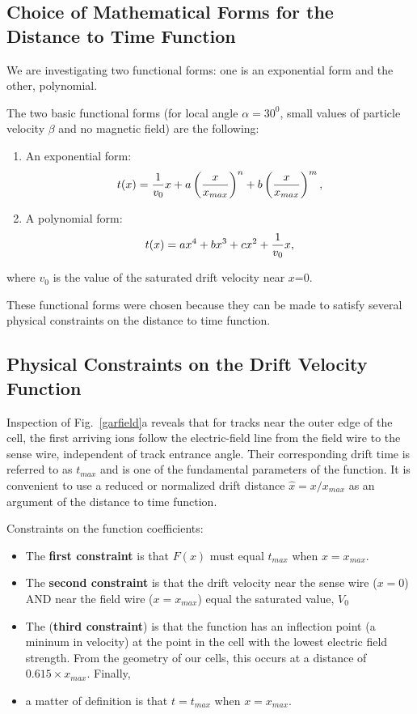 \documentclass{article}
\begin{document}
\subsection{Choice of Mathematical Forms for the Distance to Time Function}
We are investigating two functional forms: one is an exponential form and the other, polynomial.

The two basic functional forms (for local angle $\alpha = 30^0$, small values
of particle velocity $\beta$ and no magnetic field) are the following:
\begin{enumerate}
\item An exponential form:
\begin{equation}
t(x) = {1 \over v_0} x + a \left( {x \over x_{max}} \right)^n
+ b \left( { x \over x_{max}} \right)^m,
\end{equation}
\item A polynomial form:
\begin{equation}
t(x) =  a x^4 + b x^3 + c x^2 + {1 \over v_0} x,
\end{equation}
\end{enumerate}

\noindent
where $v_0$ is the value of the saturated drift velocity near $x$=0.

These functional forms were chosen because they can be made to satisfy several physical
constraints on the distance to time function.

\subsection{Physical Constraints on the Drift Velocity Function}

Inspection of  Fig.~\ref{garfield}a reveals that for tracks near the outer
edge of the cell, the first arriving ions follow the electric-field line from 
the field wire to the sense wire, independent of track entrance angle.  Their 
corresponding drift time is referred to as $t_{max}$ and is one of the fundamental
parameters of the function. It is convenient to use a reduced or normalized 
drift distance $\hat{x}=x/x_{max}$ as an argument of the distance to time function.

Constraints on the function coefficients:
\begin{itemize}
\item The {\bf first constraint} is that $F(x)$ must equal $t_{max}$ when $x = x_{max} $.
\item The {\bf second constraint} is that the drift velocity near the sense wire ($x = 0$)
AND near the field wire ($x = x_{max}$) equal the saturated value, $V_0$
\item The ({\bf third constraint}) is that the function has an inflection point (a
mininum in velocity) at the point in the cell with the lowest electric field
strength.  From the geometry of our cells, this occurs at a distance
of $ 0.615 \times x_{max}$.  Finally,
\item a matter of definition is that $t = t_{max}$ when $x = x_{max}$.
\end{itemize}
\end{document}
